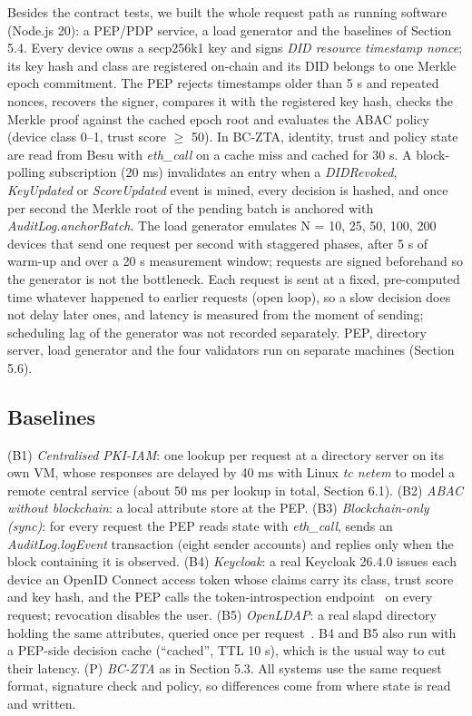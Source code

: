 \documentclass[a4paper,5p,times,twocolumn,number,sort&compress]{elsarticle}
\begin{document}
Besides the contract tests, we built the whole request path as running software (Node.js 20): a PEP/PDP service, a load generator and the baselines of Section 5.4. Every device owns a secp256k1 key and signs \emph{DID \textbar{} resource \textbar{} timestamp \textbar{} nonce}; its key hash and class are registered on-chain and its DID belongs to one Merkle epoch commitment. The PEP rejects timestamps older than 5 s and repeated nonces, recovers the signer, compares it with the registered key hash, checks the Merkle proof against the cached epoch root and evaluates the ABAC policy (device class 0--1, trust score $\geq$ 50). In BC-ZTA, identity, trust and policy state are read from Besu with \emph{eth\_call} on a cache miss and cached for 30 s. A block-polling subscription (20 ms) invalidates an entry when a \emph{DIDRevoked}, \emph{KeyUpdated} or \emph{ScoreUpdated} event is mined, every decision is hashed, and once per second the Merkle root of the pending batch is anchored with \emph{AuditLog.anchorBatch}. The load generator emulates N = 10, 25, 50, 100, 200 devices that send one request per second with staggered phases, after 5 s of warm-up and over a 20 s measurement window; requests are signed beforehand so the generator is not the bottleneck. Each request is sent at a fixed, pre-computed time whatever happened to earlier requests (open loop), so a slow decision does not delay later ones, and latency is measured from the moment of sending; scheduling lag of the generator was not recorded separately. PEP, directory server, load generator and the four validators run on separate machines (Section 5.6).

\subsection{Baselines}

(B1) \emph{Centralised PKI-IAM}: one lookup per request at a directory server on its own VM, whose responses are delayed by 40 ms with Linux \emph{tc netem} to model a remote central service (about 50 ms per lookup in total, Section 6.1). (B2) \emph{ABAC without blockchain}: a local attribute store at the PEP. (B3) \emph{Blockchain-only (sync)}: for every request the PEP reads state with \emph{eth\_call}, sends an \emph{AuditLog.logEvent} transaction (eight sender accounts) and replies only when the block containing it is observed. (B4) \emph{Keycloak}: a real Keycloak 26.4.0 issues each device an OpenID Connect access token whose claims carry its class, trust score and key hash, and the PEP calls the token-introspection endpoint~\cite{rfc7662} on every request; revocation disables the user. (B5) \emph{OpenLDAP}: a real slapd directory holding the same attributes, queried once per request~\cite{rfc4511}. B4 and B5 also run with a PEP-side decision cache (``cached'', TTL 10 s), which is the usual way to cut their latency. (P) \emph{BC-ZTA} as in Section 5.3. All systems use the same request format, signature check and policy, so differences come from where state is read and written.
\end{document}
